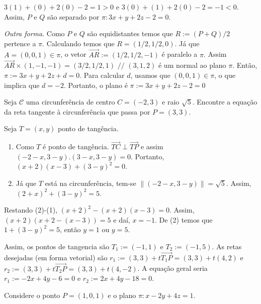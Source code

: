 \documentclass[11pt]{exam}
\begin{document}
\begin{questions}
\begin{solution}
\begin{enumerate}
				 $3(1)+(0)+2(0)-2=1>0$ e 
				 $3(0)+(1)+2(0)-2=-1<0$. Assim, $P$ e $Q$ são separado por 
				 $\pi: 3x+y+2z-2=0$. 
			\end{enumerate}       
		\end{solution}
		\begin{solution}
			{\it Outra forma}. 
			Como $P$ e $Q$ são equidistantes temos que $R:=(P+Q)/2$
			pertence a $\pi$. Calculando temos que  $R=(1/2,1/2,0)$. Já que 
			$A=(0,0,1) \in \pi$, o vetor $\overrightarrow{AR}:=(1/2,1/2,-1)$
			é paralelo a $\pi$. 
			Assim $\overrightarrow{AR}\times (1,-1,-1)=(3/2,1/2,1)$ $//$ $(3,1,2)$
			é um normal ao plano $\pi$. 
			Então, $\pi:=3x+y+2z+d=0$. Para calcular $d$, usamos 
			que $(0,0,1) \in \pi$,  o que implica que $d=-2$. Portanto, o plano 
			é $\pi:=3x+y+2z-2=0$
		\end{solution}
		\question[20] Seja $\mathcal{C}$ uma circunferência de centro 
		$C=(-2,3)$ e raio $\sqrt{5}$. Encontre a equação da reta tangente à circunferência que passa por $P=(3,3)$. 
		\begin{solution}
			Seja $T=(x,y)$ ponto de tangência. 
			\begin{enumerate}
				\item Como $T$ é ponto de tangência. 
				$\overrightarrow{TC} \perp \overrightarrow{TP}$ e
				assim $(-2-x, 3-y).(3-x,3-y)=0$. Portanto, $(x+2)(x-3)+(3-y)^{2}=0$. 
				\item Já que $T$ está na circunferência, tem-se $\|(-2-x, 3-y)\|=\sqrt{5}$. Assim, $(2+x)^{2}+(3-y)^{2}=5$.
			\end{enumerate}
			Restando (2)-(1), $(x+2)^{2}-(x+2)(x-3)=0$. Assim, $(x+2)(x+2-(x-3))=5$
			e daí, $x=-1$. De (2) temos que $1+(3-y)^{2}=5$, então $y=1$ ou $y=5$.
			
			Assim, os pontos de tangencia são $T_1:=(-1,1)$ e $T_{2}:=(-1,5)$.
			As retas desejadas (em forma vetorial) são 
			$r_1:=(3,3)+t\overrightarrow{T_{1}P}=(3,3)+t(4,2)$
			e     $r_2:=(3,3)+t\overrightarrow{T_2P}=(3,3)+t(4,-2)$. A equação geral seria 
			$r_{1}:=-2x+4y-6=0$ e  
			$r_{2}:=2x+4y-18=0$. 
		\end{solution}
		\question Considere o ponto $P=(1,0,1)$ e o plano $\pi: x-2y+4z=1$.
\end{questions}
\end{document}
